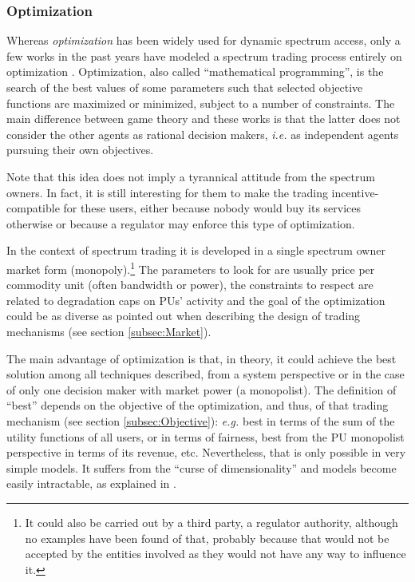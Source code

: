 \subsubsection{Optimization}
\label{sec:Optimization}
Whereas \textit{optimization} has been widely used for dynamic spectrum access, only a few works in the past years have modeled a spectrum trading process entirely on optimization \cite{ref:Mutlu2008,ref:Yang2011}. Optimization, also called ``mathematical programming'', is the search of the best values of some parameters such that selected objective functions are maximized or minimized, subject to a number of constraints. 
The main difference between game theory and these works is that the latter does not consider the other agents as rational decision makers, \textit{i.e.} as independent agents pursuing their own objectives. 

Note that this idea does not imply a tyrannical attitude from the spectrum owners. 
In fact, it is still interesting for them to make the trading incentive-compatible for these users, either because nobody would buy its services otherwise or because a regulator may enforce this type of optimization.

In the context of spectrum trading it is developed in a single spectrum owner market form (monopoly).\footnote {It could also be carried out by a third party, a regulator authority, although no examples have been found of that, probably because that would not be accepted by the entities involved as they would not have any way to influence it.}
The parameters to look for are usually price per commodity unit (often bandwidth or power), the constraints to respect are related to degradation caps on PUs' activity and the goal of the optimization could be as diverse as pointed out when describing the design of trading mechanisms (see section \ref{subsec:Market}).

The main advantage of optimization is that, in theory, it could achieve the best solution among all techniques described, from a system perspective or in the case of only one decision maker with market power (a monopolist). The definition of ``best'' depends on the objective of the optimization, and thus, of that trading mechanism (see section \ref{subsec:Objective}): \textit{e.g.} best in terms of the sum of the utility functions of all users, or in terms of fairness, best from the PU monopolist perspective in terms of its revenue, etc. 
Nevertheless, that is only possible in very simple models. 
It suffers from the ``curse of dimensionality'' and models become easily intractable, as explained in \cite{ref:Ji2006}.

